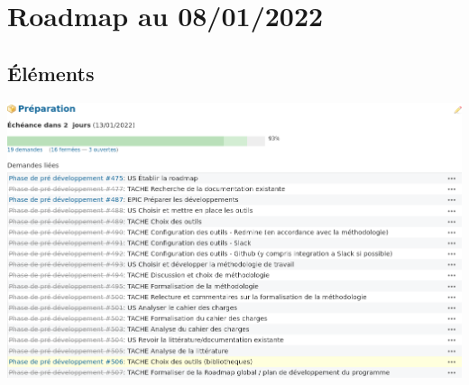 \section{Roadmap au 08/01/2022}

\subsection{Éléments}

\noindent%
\includegraphics[scale=0.5]{images/roadmap_prepa.png}

